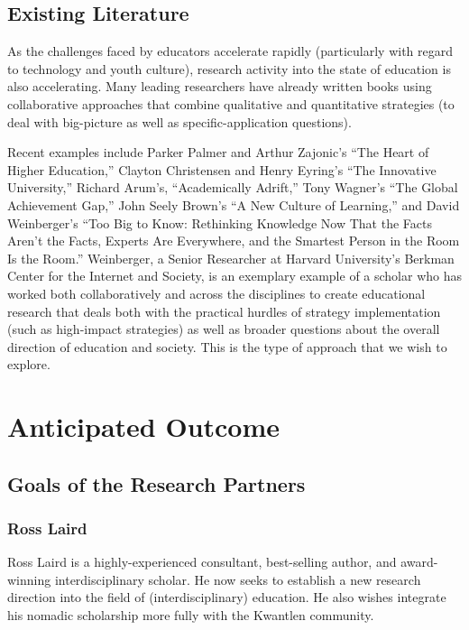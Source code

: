 \documentclass[letterpaper,10pt,headsepline]{scrreprt}
\begin{document}
\subsection{Existing Literature}

As the challenges faced by educators accelerate rapidly (particularly with
regard to technology and youth culture), research activity into the state of
education is also accelerating. Many leading researchers have already written
books using collaborative approaches that combine qualitative and quantitative
strategies (to deal with big-picture as well as specific-application
questions).

Recent examples include Parker Palmer and Arthur Zajonic's ``The Heart of
Higher Education,'' Clayton Christensen and Henry Eyring's ``The Innovative
University,'' Richard Arum's, ``Academically Adrift,'' Tony Wagner's ``The Global
Achievement Gap,'' John Seely Brown's ``A New Culture of Learning,'' and David
Weinberger's ``Too Big to Know: Rethinking Knowledge Now That the Facts Aren't
the Facts, Experts Are Everywhere, and the Smartest Person in the Room Is the
Room.'' Weinberger, a Senior Researcher at Harvard University's Berkman Center
for the Internet and Society, is an exemplary example of a scholar who has
worked both collaboratively and across the disciplines to create educational
research that deals both with the practical hurdles of strategy implementation
(such as high-impact strategies) as well as broader questions about the
overall direction of education and society. This is the type of approach that
we wish to explore.


\section{Anticipated Outcome}

\subsection{Goals of the Research Partners}

\subsubsection{Ross Laird}

Ross Laird is a highly-experienced consultant, best-selling author, and
award-winning interdisciplinary scholar. He now seeks to establish a new
research direction into the field of (interdisciplinary) education. He also
wishes integrate his nomadic scholarship more fully with the Kwantlen
community.
\end{document}
